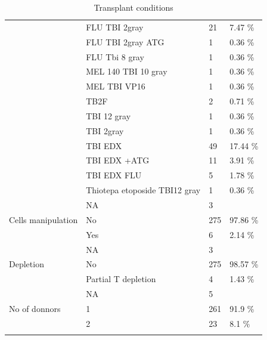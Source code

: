 \documentclass[a4paper,11pt] {article}
\begin{document}
\begin{longtable}{llll}
   & FLU TBI 2gray & 21 & 7.47 \% \\ 
   & FLU TBI 2gray ATG & 1 & 0.36 \% \\ 
   & FLU Tbi 8 gray & 1 & 0.36 \% \\ 
   & MEL 140 TBI 10 gray & 1 & 0.36 \% \\ 
   & MEL TBI VP16 & 1 & 0.36 \% \\ 
   & TB2F & 2 & 0.71 \% \\ 
   & TBI 12 gray & 1 & 0.36 \% \\ 
   & TBI 2gray & 1 & 0.36 \% \\ 
   & TBI EDX & 49 & 17.44 \% \\ 
   & TBI EDX +ATG & 11 & 3.91 \% \\ 
   & TBI EDX FLU & 5 & 1.78 \% \\ 
   & Thiotepa etoposide TBI12 gray & 1 & 0.36 \% \\ 
   & NA & 3 &  \\ 
  Cells manipulation & No & 275 & 97.86 \% \\ 
   & Yes & 6 & 2.14 \% \\ 
   & NA & 3 &  \\ 
  Depletion & No & 275 & 98.57 \% \\ 
   & Partial T depletion & 4 & 1.43 \% \\ 
   & NA & 5 &  \\ 
  No of donnors & 1 & 261 & 91.9 \% \\ 
   & 2 & 23 & 8.1 \% \\ 
   \hline
\hline
\caption{Transplant conditions} 
\label{tab:g}
\end{longtable}
\pagebreak
\end{document}
